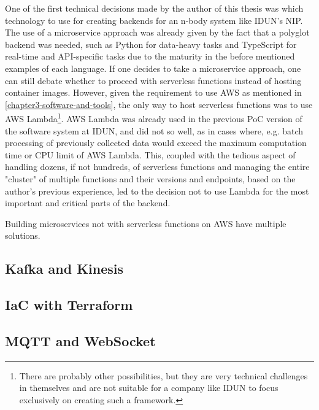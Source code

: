 One of the first technical decisions made by the author of this thesis was which technology to use for creating backends for an n-body system like IDUN's NIP. The use of a microservice approach was already given by the fact that a polyglot backend was needed, such as Python for data-heavy tasks and TypeScript for real-time and API-specific tasks due to the maturity in the before mentioned examples of each language. If one decides to take a microservice approach, one can still debate whether to proceed with serverless functions instead of hosting container images. However, given the requirement to use AWS as mentioned in \autoref{chapter3-software-and-tools}, the only way to host serverless functions was to use AWS Lambda\footnote{There are probably other possibilities, but they are very technical challenges in themselves and are not suitable for a company like IDUN to focus exclusively on creating such a framework.}. AWS Lambda was already used in the previous PoC version of the software system at IDUN, and did not so well, as in cases where, e.g. batch processing of previously collected data would exceed the maximum computation time or CPU limit of AWS Lambda. This, coupled with the tedious aspect of handling dozens, if not hundreds, of serverless functions and managing the entire "cluster" of multiple functions and their versions and endpoints, based on the author's previous experience, led to the decision not to use Lambda for the most important and critical parts of the backend.

Building microservices not with serverless functions on AWS have multiple solutions. 


\subsection{Kafka and Kinesis}
\label{chapter4-kafka-aws-kinesis}

\subsection{IaC with Terraform}
\label{chapter4-iac-with-terraform}

\subsection{MQTT and WebSocket}
\label{chapter4-mqtt-and-websocket}

